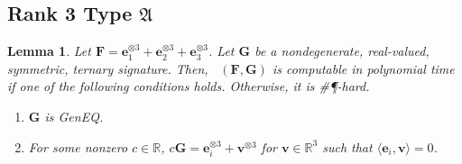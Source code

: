 \documentclass[11pt]{article}
\newtheorem{lemma}[theorem]{Lemma}
\DeclareMathOperator{\holts}{Holant^*_3}
\newcommand{\geneq}{\textsf{GenEQ}\xspace}
\newcommand{\sph}{\#\P-hard\xspace}
\newcommand{\teh}{^{\otimes 3}}
\newcommand{\ternarytractgeneq}{$\mathfrak{A}$\xspace}
\begin{document}
\subsection{Rank 3 Type \texorpdfstring{\ternarytractgeneq}{A}}
\begin{lemma}\label{lem:dichotomy-ternary-ternary-rank-3-geneq}
  Let $\mathbf{F} = \mathbf{e}_1\teh + \mathbf{e}_2\teh + \mathbf{e}_3\teh$.
  Let $\mathbf{G}$ be a nondegenerate, real-valued, symmetric, ternary signature.
  Then, $\holts(\mathbf{F}, \mathbf{G})$ is computable in polynomial time if one of the following conditions holds. Otherwise, it is \sph.
  \begin{enumerate}
    \item $\mathbf{G}$ is \geneq.
    \item For some nonzero $c \in \mathbb{R}$, $c \mathbf{G} = \mathbf{e}_i\teh + \mathbf{v} \teh$ for $\mathbf{v} \in \mathbb{R}^3$ such that $\langle \mathbf{e}_i, \mathbf{v} \rangle = 0$.
  \end{enumerate}
\end{lemma}
\end{document}
